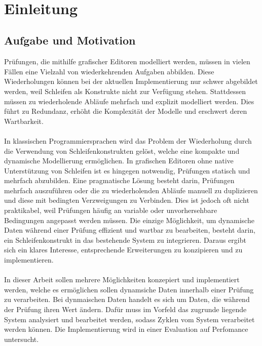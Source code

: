     \newpage
    \begin{lstlisting}
        
    \end{lstlisting}   
    \chapter{Einleitung}
    \section{Aufgabe und Motivation}
    Prüfungen, die mithilfe grafischer Editoren modelliert werden, müssen in vielen Fällen eine Vielzahl von wiederkehrenden Aufgaben abbilden. 
    Diese Wiederholungen können bei der aktuellen Implementierung nur schwer abgebildet werden, weil Schleifen als Konstrukte nicht zur Verfügung stehen. 
    Stattdessen müssen zu wiederholende Abläufe mehrfach und explizit modelliert werden. 
    Dies führt zu Redundanz, erhöht die Komplexität der Modelle und erschwert deren Wartbarkeit.\\
    \\
    In klassischen Programmiersprachen wird das Problem der Wiederholung durch die Verwendung von Schleifenkonstrukten gelöst, welche eine kompakte und dynamische Modellierung ermöglichen. 
    In grafischen Editoren ohne native Unterstützung von Schleifen ist es hingegen notwendig, Prüfungen statisch und mehrfach abzubilden. 
    Eine pragmatische Lösung besteht darin, Prüfungen mehrfach auszuführen oder die zu wiederholenden Abläufe manuell zu duplizieren und diese mit bedingten Verzweigungen zu Verbinden. 
    Dies ist jedoch oft nicht praktikabel, weil Prüfungen häufig an variable oder unvorhersehbare Bedingungen angepasst werden müssen.
    Die einzige Möglichkeit, um dynamische Daten während einer Prüfung effizient und wartbar zu bearbeiten, besteht darin, ein Schleifenkonstrukt in das bestehende System zu integrieren. 
    Daraus ergibt sich ein klares Interesse, entsprechende Erweiterungen zu konzipieren und zu implementieren.\\
    \\
    In dieser Arbeit sollen mehrere Möglichkeiten konzepiert und implementiert werden, welche es ermöglichen sollen dynamsiche Daten innerhalb einer Prüfung zu verarbeiten.
    Bei dynmaischen Daten handelt es sich um Daten, die während der Prüfung ihren Wert ändern.
    Dafür muss im Vorfeld das zugrunde liegende System analysiert und bearbeitet werden, sodass Zyklen vom System verarbeitet werden können.
    Die Implementierung wird in einer Evaluation auf Perfomance untersucht.
